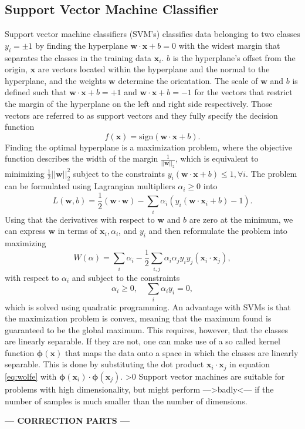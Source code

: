 \subsection{Support Vector Machine Classifier}
Support vector machine classifiers (SVM's) classifies data belonging to two classes $y_i = \pm 1$ by finding the hyperplane $\boldsymbol{w} \cdot \boldsymbol{x} + b = 0$ with the widest margin that separates the classes in the training data $\boldsymbol{x}_i$. $b$ is the hyperplane's offset from the origin, $\boldsymbol{x}$ are vectors located within the hyperplane and the normal to the hyperplane, and the weights $\boldsymbol{w}$ determine the orientation. The scale of $\boldsymbol{w}$ and $b$ is defined such that $\boldsymbol{w} \cdot \boldsymbol{x} + b = +1$ and $\boldsymbol{w} \cdot \boldsymbol{x} + b = -1$ for the vectors that restrict the margin of the hyperplane on the left and right side respectively. Those vectors are referred to as support vectors and they fully specify the decision function
\[
f(\boldsymbol{x}) = \text{sign}(\boldsymbol{w}\cdot \boldsymbol{x} + b).
\]
Finding the optimal hyperplane is a maximization problem, where the objective function describes the width of the margin $\frac{1}{||\boldsymbol{w}||_2}$, which is equivalent to minimizing $\frac{1}{2}||\boldsymbol{w}||_2^2$ subject to the constraints $y_i (\boldsymbol{w}\cdot \boldsymbol{x} + b)\leq 1, \forall i$. The problem can be formulated using Lagrangian multipliers $\alpha_i \geq 0$ into
\[
L(\boldsymbol{w},b) = \frac{1}{2}(\boldsymbol{w} \cdot \boldsymbol{w}) - \sum_i \alpha_i (y_i (\boldsymbol{w} \cdot \boldsymbol{x}_i + b) - 1).
\]
Using that the derivatives with respect to $\boldsymbol{w}$ and $b$ are zero at the minimum, we can express $\boldsymbol{w}$ in terms of $\boldsymbol{x}_i, \alpha_i$, and $y_i$ and then reformulate the problem into maximizing
\begin{equation}
W(\alpha) = \sum_i \alpha_i - \frac{1}{2} \sum_{i,j} \alpha_i \alpha_j y_i y_j (\boldsymbol{x}_i \cdot \boldsymbol{x}_j),
\label{eq:wolfe}
\end{equation}
with respect to $\alpha_i$ and subject to the constraints
\[
\alpha_i \geq 0, \quad \sum_i \alpha_i y_i = 0,
\]
which is solved using quadratic programming. An advantage with SVMs is that the maximization problem is convex, meaning that the maximum found is guaranteed to be the global maximum. This requires, however, that the classes are linearly separable. If they are not, one can make use of a so called kernel function $\boldsymbol{\phi}(\boldsymbol{x})$ that maps the data onto a space in which the classes are linearly separable. This is done by substituting the dot product $\boldsymbol{x}_i \cdot \boldsymbol{x}_j$ in equation \eqref{eq:wolfe} with $\boldsymbol{\phi}(\boldsymbol{x}_i) \cdot \boldsymbol{\phi}(\boldsymbol{x}_j)$.
\ifnum\printdraft>0
	 Support vector machines are suitable for problems with high dimensionality, but might perform --->badly<--- if the number of samples is much smaller than the number of dimensions. \cite{Campbell11SVM}
\else
\begin{center}
	\textbf{--- CORRECTION PARTS ---}
\end{center}
\fi
